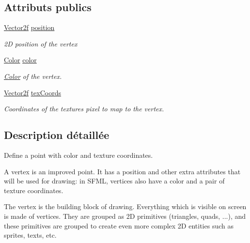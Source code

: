 \subsection*{Attributs publics}
\begin{DoxyCompactItemize}
\item 
\mbox{\label{classsf_1_1Vertex_a8a4e0f4dfa7f1eb215c92e93d04f0ac0}} 
\hyperlink{classsf_1_1Vector2}{Vector2f} \hyperlink{classsf_1_1Vertex_a8a4e0f4dfa7f1eb215c92e93d04f0ac0}{position}
\begin{DoxyCompactList}\small\item\em 2D position of the vertex \end{DoxyCompactList}\item 
\mbox{\label{classsf_1_1Vertex_a799faa0629442e90f07cd2edb568ff80}} 
\hyperlink{classsf_1_1Color}{Color} \hyperlink{classsf_1_1Vertex_a799faa0629442e90f07cd2edb568ff80}{color}
\begin{DoxyCompactList}\small\item\em \hyperlink{classsf_1_1Color}{Color} of the vertex. \end{DoxyCompactList}\item 
\mbox{\label{classsf_1_1Vertex_a9e79bd05818d36c4789751908037097c}} 
\hyperlink{classsf_1_1Vector2}{Vector2f} \hyperlink{classsf_1_1Vertex_a9e79bd05818d36c4789751908037097c}{tex\+Coords}
\begin{DoxyCompactList}\small\item\em Coordinates of the texture\textquotesingle{}s pixel to map to the vertex. \end{DoxyCompactList}\end{DoxyCompactItemize}


\subsection{Description détaillée}
Define a point with color and texture coordinates. 

A vertex is an improved point. It has a position and other extra attributes that will be used for drawing\+: in S\+F\+ML, vertices also have a color and a pair of texture coordinates.

The vertex is the building block of drawing. Everything which is visible on screen is made of vertices. They are grouped as 2D primitives (triangles, quads, ...), and these primitives are grouped to create even more complex 2D entities such as sprites, texts, etc.

